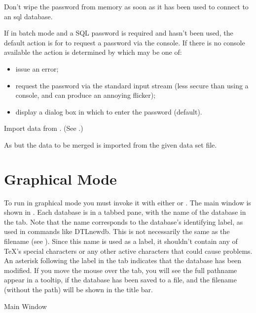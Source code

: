 Don't wipe the password from memory as soon as it 
has been used to connect to an \gls{sql} database.

If in batch mode and a SQL password is required
and  hasn't been used, the
default action is for  to request a password
via the console. If there is no console available
the action is determined by 
which may be one of:
\begin{itemize}
  \item {} issue an error;
  \item {} request the password via the standard
  input stream (less secure than using a console, and can produce 
  an annoying flicker);
  \item {} display a dialog box in which to enter the password (default).
\end{itemize}

Import  data from .
(See .)

As  but the data to be merged is imported from the
given  data set file.

\chapter{Graphical Mode}\label{sec:gui}

To run  in graphical mode you must invoke it with either 
 or . The main window
is shown in . Each database is
in a tabbed pane, with the name of the database in the
tab. Note that the name corresponds to the database's identifying
label, as used in commands like \gls{DTLnewdb}. This is 
not necessarily the same as the filename (see ). 
Since this name is used as a label, it shouldn't contain any of 
\TeX's special characters or any other active characters that could 
cause problems.  An asterisk \code{*} following the label in the tab 
indicates that the database has been modified. If you move the mouse
over the tab, you will see the full pathname appear in a tooltip,
if the database has been saved to a  file,
and the filename (without the path) will be shown in the title bar.

 {%
 }
 {Main Window}

